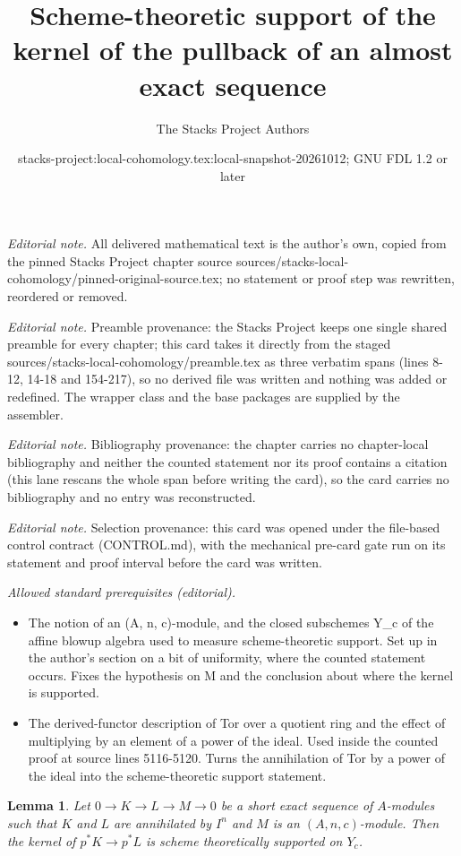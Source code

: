 \documentclass[10pt,a4paper]{amsart}
\title{Scheme-theoretic support of the kernel of the pullback of an almost exact sequence}
\author{The Stacks Project Authors}
\date{stacks-project:local-cohomology.tex:local-snapshot-20261012; GNU FDL 1.2 or later}
\theoremstyle{plain}
\newtheorem{lemma}[subsection]{Lemma}
\theoremstyle{definition}
\theoremstyle{remark}
\numberwithin{equation}{subsection}
\begin{document}
\maketitle
\noindent\textit{Editorial note.} All delivered mathematical text is the author's own, copied from the pinned Stacks Project chapter source sources/stacks-local-cohomology/pinned-original-source.tex; no statement or proof step was rewritten, reordered or removed.\par\medskip
\noindent\textit{Editorial note.} Preamble provenance: the Stacks Project keeps one single shared preamble for every chapter; this card takes it directly from the staged sources/stacks-local-cohomology/preamble.tex as three verbatim spans (lines 8-12, 14-18 and 154-217), so no derived file was written and nothing was added or redefined. The wrapper class and the base packages are supplied by the assembler.\par\medskip
\noindent\textit{Editorial note.} Bibliography provenance: the chapter carries no chapter-local bibliography and neither the counted statement nor its proof contains a citation (this lane rescans the whole span before writing the card), so the card carries no bibliography and no entry was reconstructed.\par\medskip
\noindent\textit{Editorial note.} Selection provenance: this card was opened under the file-based control contract (CONTROL.md), with the mechanical pre-card gate run on its statement and proof interval before the card was written.\par\medskip
\noindent\textit{Allowed standard prerequisites (editorial).}\begin{itemize}
\item The notion of an (A, n, c)-module, and the closed subschemes Y\_c of the affine blowup algebra used to measure scheme-theoretic support. Set up in the author's section on a bit of uniformity, where the counted statement occurs. Fixes the hypothesis on M and the conclusion about where the kernel is supported.
\item The derived-functor description of Tor over a quotient ring and the effect of multiplying by an element of a power of the ideal. Used inside the counted proof at source lines 5116-5120. Turns the annihilation of Tor by a power of the ideal into the scheme-theoretic support statement.
\end{itemize}\medskip
\begin{lemma}
\label{lemma-almost-exactness}
Let $0 \to K \to L \to M \to 0$ be a short exact sequence of $A$-modules
such that $K$ and $L$ are annihilated by $I^n$ and $M$ is an
$(A, n, c)$-module. Then the kernel of $p^*K \to p^*L$
is scheme theoretically supported on $Y_c$.
\end{lemma}
\end{document}
